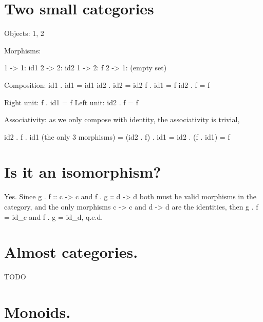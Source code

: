 

\section{Two small categories}

Objects: 1, 2

Morphisms: 

1 -> 1: id1
2 -> 2: id2
1 -> 2: f
2 -> 1: (empty set)

Composition:
  id1 . id1 = id1
  id2 . id2 = id2
  f . id1 = f
  id2 . f = f

Right unit: f . id1 = f
Left unit: id2 . f = f

Associativity: as we only compose with identity, the associativity is trivial,

   id2 . f . id1 (the only 3 morphisms) = (id2 . f) . id1 = id2 . (f . id1) = f

\section{Is it an isomorphism?}

Yes. Since g . f :: c -> c and f . g :: d -> d both must be valid morphisms
in the category, and the only morphisms c -> c and d -> d are the identities,
then g . f = id_c and f . g = id_d, q.e.d.

\section{ Almost categories. }

TODO

\section{ Monoids. }



